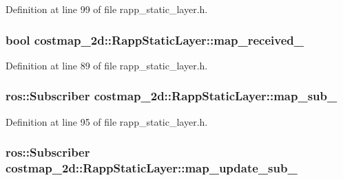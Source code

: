 Definition at line 99 of file rapp\-\_\-static\-\_\-layer.\-h.

\hypertarget{classcostmap__2d_1_1RappStaticLayer_abe9f1fbe3e0a5f77fb5c20352dc8fd7d}{
\subsubsection[{map\-\_\-received\-\_\-}]{\setlength{\rightskip}{0pt plus 5cm}bool costmap\-\_\-2d\-::\-Rapp\-Static\-Layer\-::map\-\_\-received\-\_\-\hspace{0.3cm}{\ttfamily [private]}}}\label{classcostmap__2d_1_1RappStaticLayer_abe9f1fbe3e0a5f77fb5c20352dc8fd7d}


Definition at line 89 of file rapp\-\_\-static\-\_\-layer.\-h.

\hypertarget{classcostmap__2d_1_1RappStaticLayer_a3ec9bdcd0e1fd00e0413ca2ace33213c}{
\subsubsection[{map\-\_\-sub\-\_\-}]{\setlength{\rightskip}{0pt plus 5cm}ros\-::\-Subscriber costmap\-\_\-2d\-::\-Rapp\-Static\-Layer\-::map\-\_\-sub\-\_\-\hspace{0.3cm}{\ttfamily [private]}}}\label{classcostmap__2d_1_1RappStaticLayer_a3ec9bdcd0e1fd00e0413ca2ace33213c}


Definition at line 95 of file rapp\-\_\-static\-\_\-layer.\-h.

\hypertarget{classcostmap__2d_1_1RappStaticLayer_a2a347b65373e54e1755412c145115369}{
\subsubsection[{map\-\_\-update\-\_\-sub\-\_\-}]{\setlength{\rightskip}{0pt plus 5cm}ros\-::\-Subscriber costmap\-\_\-2d\-::\-Rapp\-Static\-Layer\-::map\-\_\-update\-\_\-sub\-\_\-\hspace{0.3cm}{\ttfamily [private]}}}\label{classcostmap__2d_1_1RappStaticLayer_a2a347b65373e54e1755412c145115369}


